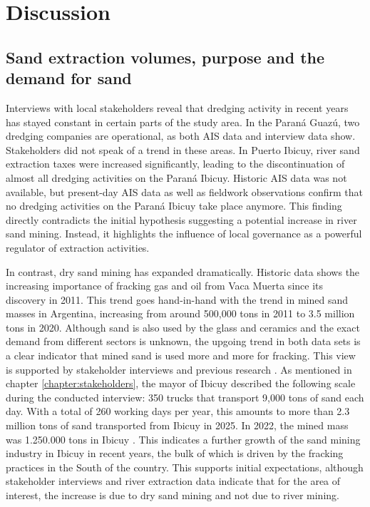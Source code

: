 \chapter{Discussion}

\section{Sand extraction volumes, purpose and the demand for sand}
Interviews with local stakeholders reveal that dredging activity in recent years has stayed constant in certain parts of the study area. In the Paraná Guazú, two dredging companies are operational, as both AIS data and interview data show. Stakeholders did not speak of a trend in these areas. In Puerto Ibicuy, river sand extraction taxes were increased significantly, leading to the discontinuation of almost all dredging activities on the Paraná Ibicuy. Historic AIS data was not available, but present-day AIS data as well as fieldwork observations confirm that no dredging activities on the Paraná Ibicuy take place anymore. This finding directly contradicts the initial hypothesis suggesting a potential increase in river sand mining. Instead, it highlights the influence of local governance as a powerful regulator of extraction activities.

In contrast, dry sand mining has expanded dramatically. Historic data shows the increasing importance of fracking gas and oil from Vaca Muerta since its discovery in 2011. This trend goes hand-in-hand with the trend in mined sand masses in Argentina, increasing from around 500,000 tons in 2011 to 3.5 million tons in 2020. Although sand is also used by the glass and ceramics and the exact demand from different sectors is unknown, the upgoing trend in both data sets is a clear indicator that mined sand is used more and more for fracking. This view is supported by stakeholder interviews and previous research \autocite{fogliaSedArena2023} \autocite{secretariadepoliticamineraArenasParaFracking2019}. As mentioned in chapter \ref{chapter:stakeholders}, the mayor of Ibicuy described the following scale during the conducted interview: 350 trucks that transport 9,000 tons of sand each day. With a total of 260 working days per year, this amounts to more than 2.3 million tons of sand transported from Ibicuy in 2025. In 2022, the mined mass was 1.250.000 tons in Ibicuy \autocite{fogliaSedArena2023}. This indicates a further growth of the sand mining industry in Ibicuy in recent years, the bulk of which is driven by the fracking practices in the South of the country. This supports initial expectations, although stakeholder interviews and river extraction data indicate that for the area of interest, the increase is due to dry sand mining and not due to river mining. 

